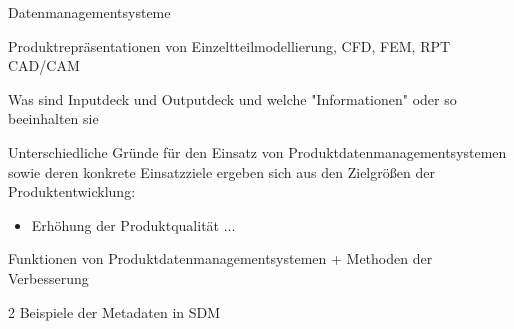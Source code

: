 \documentclass[
	ngerman,
	color = black,
	]{tudaexercise}
\begin{document}
\begin{task}[credit=15{,}5 P]{Datenmanagementsysteme}
	\begin{subtask}[credit=5 P]
		 Produktrepräsentationen von Einzeltteilmodellierung, CFD, FEM, RPT CAD/CAM
	\end{subtask}
	
	\begin{subtask}[credit=2 P]
		
	\end{subtask}
	
	\begin{subtask}[credit=2{,}5 P]
		Was sind Inputdeck und Outputdeck und welche "Informationen" oder so beeinhalten sie
	\end{subtask}
	
	Unterschiedliche Gründe für den Einsatz von Produktdatenmanagementsystemen sowie deren konkrete Einsatzziele ergeben sich aus den Zielgrößen der Produktentwicklung:
	\begin{itemize}
		\item Erhöhung der Produktqualität
		...
	\end{itemize} %
	
	\begin{subtask}[credit=4 P]
		Funktionen von Produktdatenmanagementsystemen
		+ Methoden der Verbesserung
	\end{subtask}
	
	\begin{subtask}[credit=2 P]
		2 Beispiele der Metadaten in SDM
	\end{subtask}
\end{task}
\end{document}
